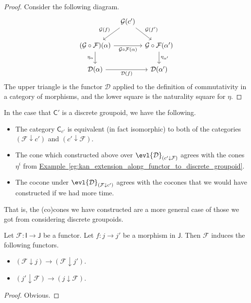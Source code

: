 \documentclass[notes.tex]{subfiles}
\begin{document}
\begin{proof}
  Consider the following diagram.
  \begin{equation*}
    \begin{tikzcd}[column sep=tiny]
      & \mathcal{G}(c')
      \arrow[ld, swap, "\mathcal{G}(f)"]
      \arrow[rd, "\mathcal{G}(f')"]
      \\
      (\mathcal{G} \circ \mathcal{F})(\alpha)
      \arrow[rr, swap, "\mathcal{G} \circ \mathcal{F}(\alpha)"]
      \arrow[d, swap, "\eta_{\alpha}"]
      && \mathcal{G} \circ \mathcal{F}(\alpha')
      \arrow[d, "\eta_{\alpha'}"]
      \\
      \mathcal{D}(\alpha)
      \arrow[rr, swap, "\mathcal{D}(f)"]
      &&\mathcal{D}(\alpha')
    \end{tikzcd}
  \end{equation*}
  The upper triangle is the functor $\mathcal{D}$ applied to the definition of commutativity in a category of morphisms, and the lower square is the naturality square for $\eta$.
\end{proof}

\begin{example}
  In the case that $\mathsf{C}'$ is a discrete groupoid, we have the following.

  \begin{itemize}
    \item The category $\mathsf{C}_{c'}$ is equivalent (in fact isomorphic) to both of the categories $(\mathcal{F} \downarrow c')$ and $(c' \downarrow \mathcal{F})$.

    \item The cone which constructed above over $\evl{\mathcal{D}}_{(c' \downarrow \mathcal{F})}$ agrees with the cones $\eta^{i}$ from \hyperref[eg:kan_extension_along_functor_to_discrete_groupoid]{Example~\ref*{eg:kan_extension_along_functor_to_discrete_groupoid}}.

    \item The cocone under $\evl{\mathcal{D}}_{(\mathcal{F} \downarrow c')}$ agrees with the cocones that we would have constructed if we had more time.
  \end{itemize}

  That is, the (co)cones we have constructed are a more general case of those we got from considering discrete groupoids.
\end{example}

\begin{lemma}
  \label{lemma:morphism_induces_functor_between_comma_categories}
  Let $\mathcal{F}\colon \mathsf{I} \to \mathsf{J}$ be a functor. Let $f\colon j \to j'$ be a morphism in $\mathsf{J}$. Then $\mathcal{F}$ induces the following functors.
  \begin{itemize}
    \item $(\mathcal{F} \downarrow j) \to (\mathcal{F} \downarrow j')$.

    \item $(j' \downarrow \mathcal{F}) \to (j \downarrow \mathcal{F})$.
  \end{itemize}
\end{lemma}
\begin{proof}
  Obvious.
\end{proof}
\end{document}
